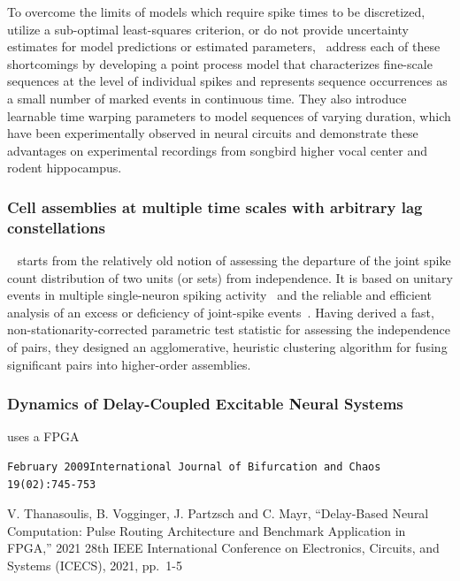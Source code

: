 \documentclass[brainsci, %
               review,submit,pdftex,moreauthors]{Definitions/mdpi}
\begin{document}
To overcome the limits of models which require spike times to be discretized, utilize a sub-optimal least-squares criterion, or do not provide uncertainty estimates for model predictions or estimated parameters,~\citep{williams_point_2020} address each of these shortcomings by developing a point process model that characterizes fine-scale sequences at the level of individual spikes and represents sequence occurrences as a small number of marked events in continuous time. They also introduce learnable time warping parameters to model sequences of varying duration, which have been experimentally observed in neural circuits and demonstrate these advantages on experimental recordings from songbird higher vocal center and rodent hippocampus.


\subsubsection{Cell assemblies at multiple time scales with arbitrary lag constellations}\label{cell-assemblies-at-multiple-time-scales-with-arbitrary-lag-constellations}
~\citep{russo_cell_2017} starts from the relatively old notion of assessing the departure of the joint spike count distribution of two units (or sets) from independence. It is based on unitary events in multiple single-neuron spiking activity~\citep{grun_unitary_2002-1} and the reliable and efficient analysis of an excess or deficiency of joint-spike events~\citep{pipa_neuroxidence_2008}. Having derived a fast, non-stationarity-corrected parametric test statistic for assessing the independence of pairs, they designed an agglomerative, heuristic clustering algorithm for fusing significant pairs into higher-order assemblies.


\subsubsection{Dynamics of Delay-Coupled Excitable Neural Systems}
uses a FPGA
~\citep{dahlem_dynamics_2009}

\begin{verbatim}
February 2009International Journal of Bifurcation and Chaos 19(02):745-753
\end{verbatim}

V. Thanasoulis, B. Vogginger, J. Partzsch and C. Mayr, ``Delay-Based Neural Computation: Pulse Routing Architecture and Benchmark Application in FPGA,'' 2021 28th IEEE International Conference on Electronics, Circuits, and Systems (ICECS), 2021, pp.~1-5
~\citep{thanasoulis_delay-based_2021}
\end{document}

